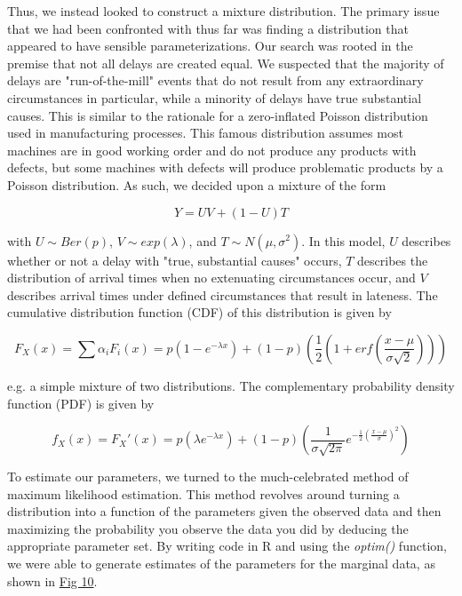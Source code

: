 \documentclass[12pt, a4paper, openany]{book}
\newcommand\tab[1][1cm]{\hspace*{#1}}
\begin{document}
	\tab Thus, we instead looked to construct a mixture distribution. The primary issue that we had been confronted with thus far was finding a distribution that appeared to have sensible parameterizations.  Our search was rooted in the premise that not all delays are created equal. We suspected that the majority of delays are "run-of-the-mill" events that do not result from any extraordinary circumstances in particular, while a minority of delays have true substantial causes. This is similar to the rationale for a zero-inflated Poisson distribution used in manufacturing processes. This famous distribution assumes most machines are in good working order and do not produce any products with defects, but some machines with defects will produce problematic products by a Poisson distribution. As such, we decided upon a mixture of the form \begin{center}$$Y = UV + (1-U)T$$\end{center} with $U\sim Ber(p)$, $V\sim exp(\lambda)$, and $T\sim  N(\mu,\sigma^2)$. In this model, $U$ describes whether or not a delay with "true, substantial causes" occurs, $T$ describes the distribution of arrival times when no extenuating circumstances occur, and $V$ describes arrival times under defined circumstances that result in lateness. The cumulative distribution function (CDF) of this distribution is given by 
	\begin{center}$$F_X(x) = \sum \alpha_i F_i(x) = p(1-e^{-\lambda x}) + (1-p)\left(\frac{1}{2}(1+ erf(\frac{x-\mu}{\sigma\sqrt{2}}))\right)$$\end{center}
	e.g. a simple mixture of two distributions. The complementary probability density function (PDF) is given by \begin{center}
	$$f_X(x) = F_X'(x) = p(\lambda e^{-\lambda x} ) + (1-p)\left(\frac{1}{\sigma \sqrt{2\pi}} e^{-\frac{1}{2}(\frac{x-\mu}{\sigma})^2}\right)$$
	\end{center}
	To estimate our parameters, we turned to the much-celebrated method of maximum likelihood estimation. This method revolves around turning a distribution into a function of the parameters given the observed data and then maximizing the probability you observe the data you did by deducing the appropriate parameter set. By writing code in R and using the \textit{optim()} function, we were able to generate estimates of the parameters for the marginal data, as shown in \underline{Fig 10}.\\
\end{document}
